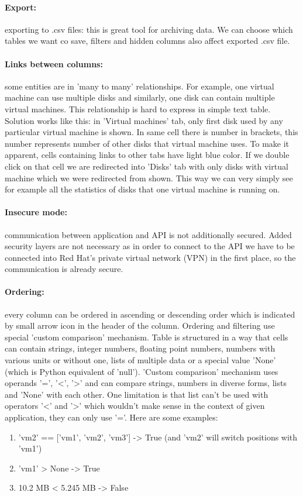 \paragraph{Export:}
exporting to .csv files: this is great tool for archiving data. We can choose which tables we want co save, filters and hidden columns also affect exported .csv file.

\paragraph{Links between columns:}
some entities are in 'many to many' relationships. For example, one virtual machine can use multiple disks and similarly, one disk can contain multiple virtual machines. This relationship is hard to express in simple text table. Solution works like this: in 'Virtual machines' tab, only first disk used by any particular virtual machine is shown. In same cell there is number in brackets, this number represents number of other disks that virtual machine uses. To make it apparent, cells containing links to other tabs have light blue color. If we double click on that cell we are redirected into 'Disks' tab with only disks with virtual machine which we were redirected from shown. This way we can very simply see for example all the statistics of disks that one virtual machine is running on.

\paragraph{Insecure mode:}
communication between application and API is not additionally secured. Added security layers are not necessary as in order to connect to the API we have to be connected into Red Hat's private virtual network (VPN) in the first place, so the communication is already secure.

\paragraph{Ordering:}
every column can be ordered in ascending or descending order which is indicated by small arrow icon in the header of the column. Ordering and filtering use special 'custom comparison' mechanism. Table is structured in a way that cells can contain strings, integer numbers, floating point numbers, numbers with various units or without one, lists of multiple data or a special value 'None' (which is Python equivalent of 'null'). 'Custom comparison' mechanism uses operands '=', '<', '>' and can compare strings, numbers in diverse forms, lists and 'None' with each other. One limitation is that list can't be used with operators '<' and '>' which wouldn't make sense in the context of given application, they can only use '='. Here are some examples:
\begin{enumerate}
\item 'vm2' == ['vm1', 'vm2', 'vm3'] -> True (and 'vm2' will switch positions with 'vm1')
\item 'vm1' > None -> True
\item 10.2 MB < 5.245 MB -> False
\end{enumerate}

